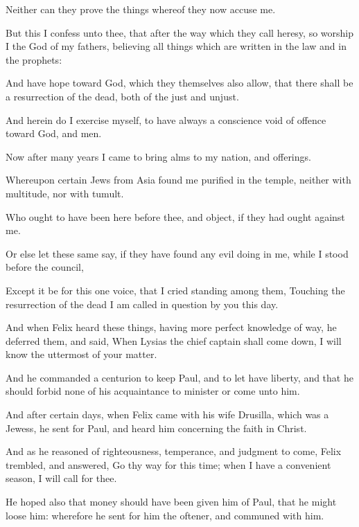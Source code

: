 {Neither can
they prove the
things
whereof
they
now
accuse
me.

But
this I
confess unto
thee,
that
after the
way
which they
call
heresy,
so worship
I the
God of my
fathers,
believing all
things
which are
written
in the
law
and in the
prophets:

And
have
hope
toward
God,
which
they
themselves
also
allow, that there
shall
be a
resurrection of the
dead,
both of the
just
and
unjust.

And
herein do I
exercise
myself, to
have
always a
conscience void of
offence
toward
God,
and
{}
men.

Now
after
many
years I
came to
bring
alms
to
my
nation,
and
offerings.

Whereupon
certain
Jews
from
Asia
found
me
purified
in the
temple,
neither
with
multitude,
nor
with
tumult.

Who
ought to have been
here
before
thee,
and
object,
if they
had
ought
against
me.

Or
else
let
these
same
{}
say,
if they have
found
any evil
doing
in
me, while
I
stood
before the
council,

Except it be
for
this
one
voice,
that I
cried
standing
among
them,
Touching the
resurrection of the
dead
I am called in
question
by
you this
day.


\par }{\PP {}And when
Felix
heard these
things,
having more
perfect
knowledge
of
{}
way, he
deferred
them, and
said,
When
Lysias the chief
captain shall come
down, I will know the
uttermost of
your
matter.

And he
commanded a
centurion to
keep
Paul,
and to
let
{}
have
liberty,
and that he should
forbid
none of
his
acquaintance to
minister
or come
unto
him.


\par }{\PP {}And
after
certain
days,
when
Felix
came
with
his
wife
Drusilla,
which was a
Jewess, he sent
for
Paul,
and
heard
him
concerning the
faith
in
Christ.

And
as
he
reasoned
of
righteousness,
temperance,
and
judgment
to
come,
Felix
trembled, and
answered, Go thy
way for this
time;
when I
have a convenient
season, I will
call for
thee.

He
hoped
also
that
money should have been
given
him
of
Paul,
that he might
loose
him:
wherefore he sent
for
him the
oftener, and
communed
with
him.

}

